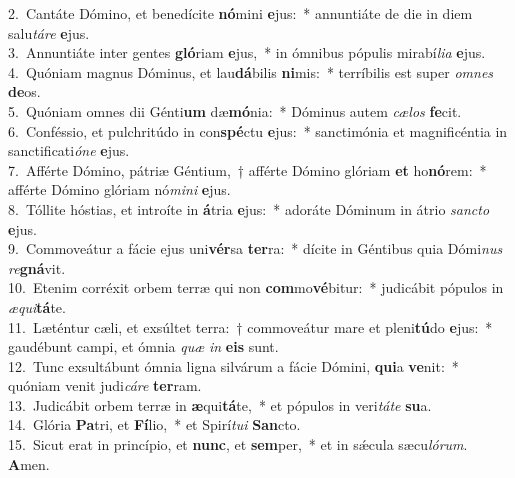 {2.~}Cantáte Dómino, et benedícite \textbf{nó}mini \textbf{e}jus:~* annuntiáte de die in diem salu\textit{tá}\textit{re} \textbf{e}jus.\\
{3.~}Annuntiáte inter gentes \textbf{gló}riam \textbf{e}jus,~* in ómnibus pópulis mirabí\textit{li}\textit{a} \textbf{e}jus.\\
{4.~}Quóniam magnus Dóminus, et lau\textbf{dá}bilis \textbf{ni}mis:~* terríbilis est super \textit{om}\textit{nes} \textbf{de}os.\\
{5.~}Quóniam omnes dii Génti\textbf{um} dæ\textbf{mó}nia:~* Dóminus autem \textit{cæ}\textit{los} \textbf{fe}cit.\\
{6.~}Conféssio, et pulchritúdo in con\textbf{spé}ctu \textbf{e}jus:~* sanctimónia et magnificéntia in sanctificati\textit{ó}\textit{ne} \textbf{e}jus.\\
{7.~}Afférte Dómino, pátriæ Géntium,~† afférte Dómino glóriam \textbf{et} ho\textbf{nó}rem:~* afférte Dómino glóriam nó\textit{mi}\textit{ni} \textbf{e}jus.\\
{8.~}Tóllite hóstias, et introíte in \textbf{á}tria \textbf{e}jus:~* adoráte Dóminum in átrio \textit{san}\textit{cto} \textbf{e}jus.\\
{9.~}Commoveátur a fácie ejus uni\textbf{vér}sa \textbf{ter}ra:~* dícite in Géntibus quia Dómi\textit{nus} \textit{re}\textbf{gná}vit.\\
{10.~}Etenim corréxit orbem terræ qui non \textbf{com}mo\textbf{vé}bitur:~* judicábit pópulos in \textit{æ}\textit{qui}\textbf{tá}te.\\
{11.~}Læténtur cæli, et exsúltet terra:~† commoveátur mare et pleni\textbf{tú}do \textbf{e}jus:~* gaudébunt campi, et ómnia \textit{quæ} \textit{in} \textbf{e}\textbf{is} sunt.\\
{12.~}Tunc exsultábunt ómnia ligna silvárum a fácie Dómini, \textbf{qui}a \textbf{ve}nit:~* quóniam venit judi\textit{cá}\textit{re} \textbf{ter}ram.\\
{13.~}Judicábit orbem terræ in \textbf{æ}qui\textbf{tá}te,~* et pópulos in veri\textit{tá}\textit{te} \textbf{su}a.\\
{14.~}Glória \textbf{Pa}tri, et \textbf{Fí}lio,~* et Spirí\textit{tu}\textit{i} \textbf{San}cto.\\
{15.~}Sicut erat in princípio, et \textbf{nunc}, et \textbf{sem}per,~* et in sǽcula sæcu\textit{ló}\textit{rum}. \textbf{A}men.\\
